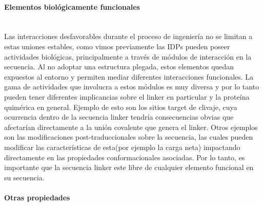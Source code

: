 \paragraph{Elementos biológicamente funcionales} \hspace{0pt} \\

Las interacciones desfavorables durante el proceso de ingeniería no se limitan a estas uniones estables, como vimos previamente las IDPs pueden poseer actividades biológicas, 
principalmente a través de módulos de interacción en la secuencia. 
Al no adoptar una estructura plegada, estos elementos quedan expuestos al entorno y permiten mediar diferentes interacciones funcionales.
La gama de actividades que involucra a estos módulos es muy diversa y por lo tanto pueden tener diferentes implicancias sobre el linker en particular y la proteína quimérica en general.
Ejemplo de esto son los sitios target de clivaje, cuya ocurrencia dentro de la secuencia linker tendría consecuencias obvias que afectarían directamente a la unión covalente que genera el linker.
Otros ejemplos son las modificaciones post-traduccionales sobre la secuencia, las cuales pueden modificar las características de esta(por ejemplo la carga neta) impactando directamente en las propiedades conformacionales asociadas.
Por lo tanto, es importante que la secuencia linker este libre de cualquier elemento funcional en su secuencia. 




\paragraph{Otras propiedades} \hspace{0pt} \\

